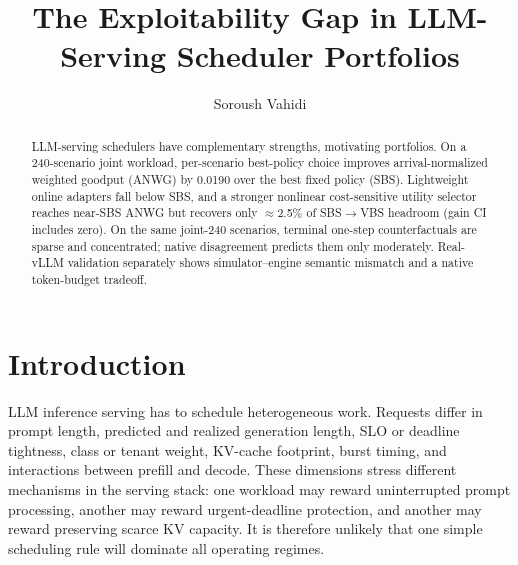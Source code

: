 \documentclass[runningheads]{llncs}
\begin{document}
\title{The Exploitability Gap in LLM-Serving Scheduler Portfolios}

\author{Soroush Vahidi}

\newcommand{\anwg}{ANWG}
\newcommand{\sbs}{SBS}
\newcommand{\vbs}{VBS}
\newcommand{\policy}[1]{\texttt{\detokenize{#1}}}

\maketitle

\begin{abstract}
LLM-serving schedulers have complementary strengths, motivating portfolios. On
a 240-scenario joint workload, per-scenario best-policy choice improves
arrival-normalized weighted goodput (ANWG) by 0.0190 over the best fixed
policy (SBS). Lightweight online adapters fall below SBS, and a stronger
nonlinear cost-sensitive utility selector reaches near-SBS ANWG but recovers
only $\approx$2.5\% of SBS$\rightarrow$VBS headroom (gain CI includes zero).
On the same joint-240 scenarios, terminal one-step counterfactuals are sparse
and concentrated; native disagreement predicts them only moderately.
Real-vLLM validation separately shows simulator--engine semantic mismatch and
a native token-budget tradeoff.

\end{abstract}

\section{Introduction}
\label{sec:introduction}

LLM inference serving has to schedule heterogeneous work. Requests differ in
prompt length, predicted and realized generation length, SLO or deadline
tightness, class or tenant weight, KV-cache footprint, burst timing, and
interactions between prefill and decode. These dimensions stress different
mechanisms in the serving stack: one workload may reward uninterrupted prompt
processing, another may reward urgent-deadline protection, and another may
reward preserving scarce KV capacity. It is therefore unlikely that one simple
scheduling rule will dominate all operating regimes.
\end{document}
